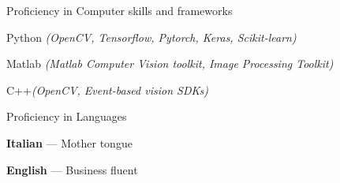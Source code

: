 


\begin{cventries}

 
  \cventry
    {Proficiency in} %
    {Computer skills and frameworks} %
    {} %
    {} %
    {
      \begin{cvitems} %
	\item Python \textit{(OpenCV, Tensorflow, Pytorch, Keras, Scikit-learn)}
	\item Matlab \textit{(Matlab Computer Vision toolkit, Image Processing Toolkit)}
	\item C++\textit{(OpenCV, Event-based vision SDKs)}
	\end{cvitems}
	}
	
  \cventry
    {Proficiency in} %
    {Languages} %
    {} %
    {} %
    {
      \begin{cvitems} %
	\item \textbf{Italian} --- {Mother tongue}
	\item \textbf{English} --- {Business fluent}
	\end{cvitems}
	}
	
	

\end{cventries}
